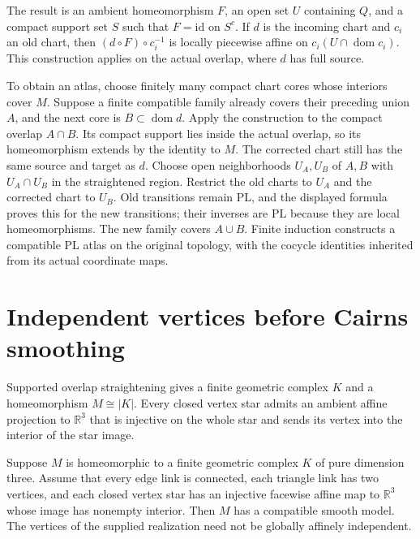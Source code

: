 The result is an ambient homeomorphism $F$, an open set $U$ containing $Q$,
and a compact support set $S$ such that $F=\mathrm{id}$ on $S^c$. If
$d$ is the incoming chart and $c_i$ an old chart, then
$(d\circ F)\circ c_i^{-1}$ is locally piecewise affine on
$c_i(U\cap\operatorname{dom}c_i)$. This construction applies on the
actual overlap, where $d$ has full source.

To obtain an atlas, choose finitely many compact chart cores whose
interiors cover $M$. Suppose a finite compatible family already covers
their preceding union $A$, and the next core is $B\subset\operatorname{dom}d$.
Apply the construction to the compact overlap $A\cap B$. Its compact
support lies inside the actual overlap, so its homeomorphism extends by
the identity to $M$. The corrected chart still has the same source and
target as $d$. Choose open neighborhoods $U_A,U_B$ of $A,B$ with
$U_A\cap U_B$ in the straightened region. Restrict the old charts to
$U_A$ and the corrected chart to $U_B$. Old transitions remain PL, and
the displayed formula proves this for the new transitions; their inverses
are PL because they are local homeomorphisms. The new family covers
$A\cup B$. Finite induction constructs a compatible PL atlas on the
original topology, with the cocycle identities inherited from its actual
coordinate maps.

\section{Independent vertices before Cairns smoothing}
\label{sec:independent-triangulation}

\begin{theorem}
\label{thm:smoothing-geometric-triangulation}
Supported overlap straightening gives a finite geometric complex $K$
and a homeomorphism $M\cong |K|$. Every closed vertex star admits an
ambient affine projection to $\mathbb R^3$ that is injective on the
whole star and sends its vertex into the interior of the star image.
\end{theorem}

\begin{theorem}
\label{thm:smoothing-triangulation}
Suppose $M$ is homeomorphic to a finite geometric complex $K$ of pure
dimension three. Assume that every edge link is connected, each triangle
link has two vertices, and each closed vertex star has an injective
facewise affine map to $\mathbb R^3$ whose image has nonempty interior.
Then $M$ has a compatible smooth model. The vertices of the supplied
realization need not be globally affinely independent.
\end{theorem}


